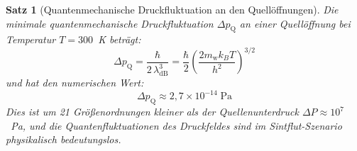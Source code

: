 ﻿\documentclass[12pt,a4paper]{report}
\newtheorem{theorem}{Satz}[chapter]
\begin{document}
\begin{theorem}[Quantenmechanische Druckfluktuation an den Quellöffnungen]
	\label{thm:druckfluktuation}
	Die minimale quantenmechanische Druckfluktuation $\Delta p_\mathrm{Q}$ an einer Quellöffnung bei Temperatur $T = 300$~K beträgt:
	\begin{equation}
		\Delta p_\mathrm{Q} = \frac{\hbar}{2\,\lambda_\mathrm{dB}^3} = \frac{\hbar}{2}\left(\frac{2m_\mathrm{w}k_BT}{h^2}\right)^{3/2}
		\label{eq:delta_p_quanten}
	\end{equation}
	und hat den numerischen Wert:
	\begin{equation}
		\Delta p_\mathrm{Q} \approx 2{,}7\times10^{-14}\;\text{Pa}
		\label{eq:delta_p_numerisch}
	\end{equation}
	Dies ist um 21 Größenordnungen kleiner als der Quellenunterdruck $\Delta P \approx 10^7$~Pa, und die Quantenfluktuationen des Druckfeldes sind im Sintflut-Szenario physikalisch bedeutungslos.
\end{theorem}
\end{document}
